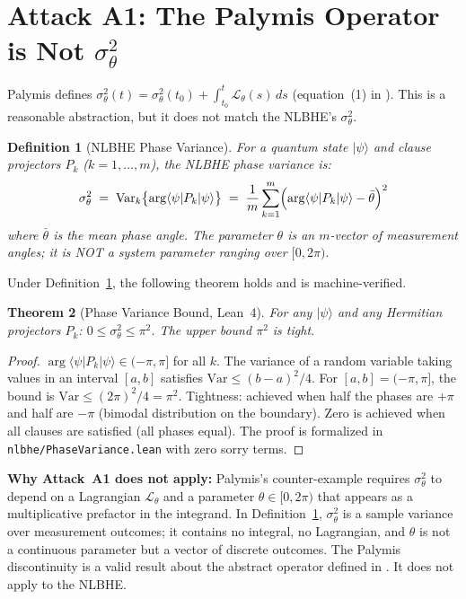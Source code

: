 \documentclass[11pt,letterpaper]{article}
\newtheorem{theorem}{Theorem}[section]
\newtheorem{definition}[theorem]{Definition}
\begin{document}
\section{Attack A1: The Palymis Operator is Not $\sigma^2_\theta$}
\label{sec:a1}

Palymis defines $\sigma^2_\theta(t) = \sigma^2_\theta(t_0) + \int_{t_0}^t\mathcal{L}_\theta(s)\,ds$
(equation~(1) in \cite{palymis2026}). This is a reasonable abstraction, but it does not match
the NLBHE's $\sigma^2_\theta$.

\begin{definition}[NLBHE Phase Variance]
\label{def:sigma}
For a quantum state $|\psi\rangle$ and clause projectors $P_k$ ($k = 1, \ldots, m$),
the NLBHE phase variance is:
\[
\sigma^2_\theta \;=\; \mathrm{Var}_{k}\bigl\{\arg\langle\psi|P_k|\psi\rangle\bigr\}
\;=\; \frac{1}{m}\sum_{k=1}^m
\Bigl(\arg\langle\psi|P_k|\psi\rangle - \bar{\theta}\Bigr)^2
\]
where $\bar{\theta}$ is the mean phase angle. The parameter $\theta$ is an $m$-vector of
measurement angles; it is NOT a system parameter ranging over $[0, 2\pi)$.
\end{definition}

Under Definition~\ref{def:sigma}, the following theorem holds and is machine-verified.

\begin{theorem}[Phase Variance Bound, Lean~4]
\label{thm:pvb}
For any $|\psi\rangle$ and any Hermitian projectors $P_k$:
$0 \leq \sigma^2_\theta \leq \pi^2$.
The upper bound $\pi^2$ is tight.
\end{theorem}
\begin{proof}
$\arg\langle\psi|P_k|\psi\rangle \in (-\pi, \pi]$ for all $k$. The variance of a random
variable taking values in an interval $[a,b]$ satisfies $\mathrm{Var} \leq (b-a)^2/4$.
For $[a,b] = (-\pi, \pi]$, the bound is $\mathrm{Var} \leq (2\pi)^2/4 = \pi^2$.
Tightness: achieved when half the phases are $+\pi$ and half are $-\pi$
(bimodal distribution on the boundary). Zero is achieved when all clauses are satisfied
(all phases equal). The proof is formalized in \texttt{nlbhe/PhaseVariance.lean} with
zero sorry terms.
\end{proof}

\textbf{Why Attack~A1 does not apply:} Palymis's counter-example requires $\sigma^2_\theta$
to depend on a Lagrangian $\mathcal{L}_\theta$ and a parameter $\theta \in [0, 2\pi)$ that
appears as a multiplicative prefactor in the integrand. In Definition~\ref{def:sigma},
$\sigma^2_\theta$ is a sample variance over measurement outcomes; it contains no integral,
no Lagrangian, and $\theta$ is not a continuous parameter but a vector of discrete outcomes.
The Palymis discontinuity is a valid result about the abstract operator defined in
\cite{palymis2026}. It does not apply to the NLBHE.
\end{document}
